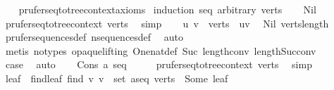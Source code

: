 \begin{isabellebody}
%
\isadelimproof
\ \ %
\endisadelimproof
%
\isatagproof
{}\isamarkupfalse%
\ prufer{\isacharunderscore}{\kern0pt}seq{\isacharunderscore}{\kern0pt}to{\isacharunderscore}{\kern0pt}tree{\isacharunderscore}{\kern0pt}context{\isacharunderscore}{\kern0pt}axioms\isanewline
{}\isamarkupfalse%
\ {\isacharparenleft}{\kern0pt}induction\ seq\ arbitrary{\isacharcolon}{\kern0pt}\ verts{\isacharparenright}{\kern0pt}\isanewline
\ \ \isamarkupfalse%
\ Nil\isanewline
\ \ \isamarkupfalse%
\ \isamarkupfalse%
\ prufer{\isacharunderscore}{\kern0pt}seq{\isacharunderscore}{\kern0pt}to{\isacharunderscore}{\kern0pt}tree{\isacharunderscore}{\kern0pt}context\ verts\ \isamarkupfalse%
\ simp\isanewline
\ \ \isamarkupfalse%
\ u\ v\ \ {\isachardoublequoteopen}verts\ {\isacharequal}{\kern0pt}\ {\isacharbrackleft}{\kern0pt}u{\isacharcomma}{\kern0pt}v{\isacharbrackright}{\kern0pt}{\isachardoublequoteclose}\ \isamarkupfalse%
\ Nil\ verts{\isacharunderscore}{\kern0pt}length\ \isamarkupfalse%
\ prufer{\isacharunderscore}{\kern0pt}sequences{\isacharunderscore}{\kern0pt}def\ n{\isacharunderscore}{\kern0pt}sequences{\isacharunderscore}{\kern0pt}def\ \isamarkupfalse%
\ auto\isanewline
\ \ \ \ \isamarkupfalse%
\ {\isacharparenleft}{\kern0pt}metis\ {\isacharparenleft}{\kern0pt}no{\isacharunderscore}{\kern0pt}types{\isacharcomma}{\kern0pt}\ opaque{\isacharunderscore}{\kern0pt}lifting{\isacharparenright}{\kern0pt}\ One{\isacharunderscore}{\kern0pt}nat{\isacharunderscore}{\kern0pt}def\ Suc{\isacharunderscore}{\kern0pt}{}\ length{\isacharunderscore}{\kern0pt}{}{\isacharunderscore}{\kern0pt}conv\ length{\isacharunderscore}{\kern0pt}Suc{\isacharunderscore}{\kern0pt}conv{\isacharparenright}{\kern0pt}\isanewline
\ \ \isamarkupfalse%
\ \isamarkupfalse%
\ {\isacharquery}{\kern0pt}case\ \isamarkupfalse%
\ auto\isanewline
{}\isamarkupfalse%
\isanewline
\ \ \isamarkupfalse%
\ {\isacharparenleft}{\kern0pt}Cons\ a\ seq{\isacharparenright}{\kern0pt}\isanewline
\ \ \isamarkupfalse%
\ \isamarkupfalse%
\ prufer{\isacharunderscore}{\kern0pt}seq{\isacharunderscore}{\kern0pt}to{\isacharunderscore}{\kern0pt}tree{\isacharunderscore}{\kern0pt}context\ verts\ \isamarkupfalse%
\ simp\isanewline
\ \ \isamarkupfalse%
\ leaf\ \ find{\isacharunderscore}{\kern0pt}leaf{\isacharcolon}{\kern0pt}\ {\isachardoublequoteopen}find\ {\isacharparenleft}{\kern0pt}{\isasymlambda}v{\isachardot}{\kern0pt}\ v\ {\isasymnotin}\ set\ {\isacharparenleft}{\kern0pt}a{\isacharhash}{\kern0pt}seq{\isacharparenright}{\kern0pt}{\isacharparenright}{\kern0pt}\ verts\ {\isacharequal}{\kern0pt}\ Some\ leaf{\isachardoublequoteclose}\isanewline

\end{isabellebody}
